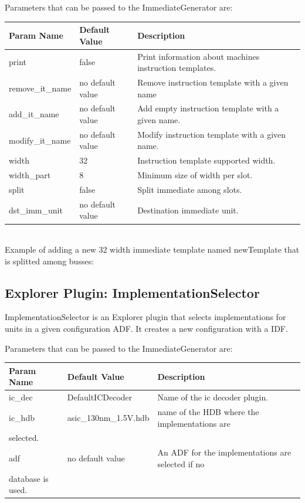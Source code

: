 \documentclass[twoside]{tceusermanual}
\begin{document}
Parameters that can be passed to the ImmediateGenerator are:

\begin{tabular}{p{}p{}
                p{}}
\textbf{Param Name} &\textbf{Default Value} &\textbf{Description} \\
\hline
print & false & Print information about machines instruction templates.\\
remove\_it\_name & no default value & Remove instruction template with a
given name \\
add\_it\_name & no default value & Add empty instruction template with a
given name. \\
modify\_it\_name & no default value & Modify instruction template with a
given name. \\
width & 32 & Instruction template supported width.\\
width\_part & 8 & Minimum size of width per slot.\\
split & false & Split immediate among slots.\\
dst\_imm\_unit & no default value & Destination immediate unit.\\
\end{tabular}\\

Example of adding a new 32 width immediate template named newTemplate that is
splitted among busses:


\subsection{Explorer Plugin: ImplementationSelector}
ImplementationSelector is an Explorer plugin that selects implementations for
units in a given configuration ADF. It creates a new configuration with a IDF.

Parameters that can be passed to the ImmediateGenerator are:

\begin{tabular}{p{}p{}
                p{}}
\textbf{Param Name} &\textbf{Default Value} &\textbf{Description} \\
\hline
ic\_dec & DefaultICDecoder & Name of the ic decoder plugin. \\
ic\_hdb & asic\_130nm\_1.5V.hdb & name of the HDB where the implementations are \\
selected. \\
adf & no default value & An ADF for the implementations are selected if no \\
database is used. \\
\end{tabular}\\
\end{document}
